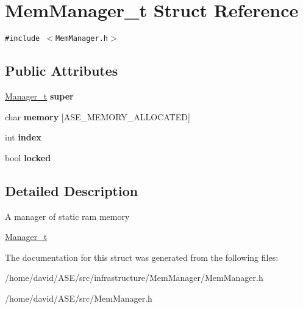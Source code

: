 \hypertarget{structMemManager__t}{
\section{MemManager\_\-t Struct Reference}
\label{structMemManager__t}
}
{\tt \#include $<$MemManager.h$>$}

\subsection*{Public Attributes}
\begin{CompactItemize}
\item 
\hypertarget{structMemManager__t_cd7201404c60d6c521c1dae41cd055b9}{
\hyperlink{structManager__t}{Manager\_\-t} \textbf{super}}
\label{structMemManager__t_cd7201404c60d6c521c1dae41cd055b9}

\item 
\hypertarget{structMemManager__t_08f698061ba63fd0495cfc0a917aee17}{
char \textbf{memory} \mbox{[}ASE\_\-MEMORY\_\-ALLOCATED\mbox{]}}
\label{structMemManager__t_08f698061ba63fd0495cfc0a917aee17}

\item 
\hypertarget{structMemManager__t_68a94f719c63e57f64d790ae5442383d}{
int \textbf{index}}
\label{structMemManager__t_68a94f719c63e57f64d790ae5442383d}

\item 
\hypertarget{structMemManager__t_905a73da0b4cbadab5e3a6e8755698fc}{
bool \textbf{locked}}
\label{structMemManager__t_905a73da0b4cbadab5e3a6e8755698fc}

\end{CompactItemize}


\subsection{Detailed Description}
A manager of static ram memory

\hyperlink{structManager__t}{Manager\_\-t} 

The documentation for this struct was generated from the following files:\begin{CompactItemize}
\item 
/home/david/ASE/src/infrastructure/MemManager/MemManager.h\item 
/home/david/ASE/src/MemManager.h\end{CompactItemize}

